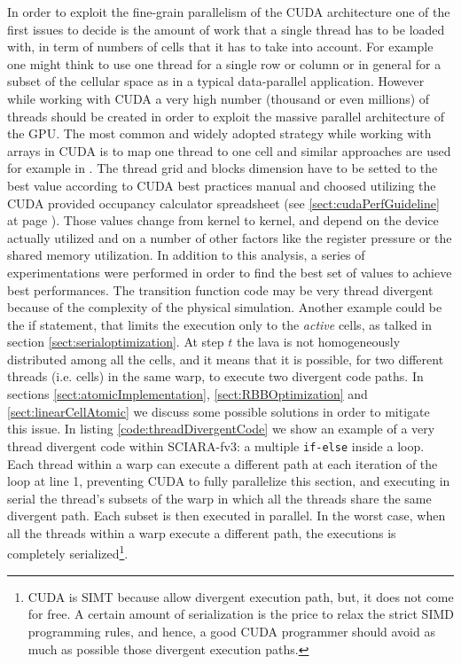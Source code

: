 In order to exploit the fine-grain parallelism of the CUDA architecture one of
the first issues to decide is the amount of work that a single thread has to be
loaded with, in term of numbers of cells that it has to take into account. For
example one might think to use one thread for a single row or column or in
general for a subset of the cellular space as in a typical data-parallel
application. However while working with CUDA a very high number (thousand or
even millions) of threads should be created in order to exploit the massive
parallel architecture of the GPU\cite{NvidiaprogGuide}. The most common and
widely adopted strategy while working with arrays in CUDA is to map one thread
to one cell and similar approaches are used for example in \cite{dambrosio2012}.
The thread grid and blocks dimension have to be setted to the best value
according to CUDA best practices\cite{CUDACBESTPRACTICE} manual and choosed
utilizing the CUDA provided occupancy calculator spreadsheet (see
\ref{sect:cudaPerfGuideline} at page \pageref{sect:cudaPerfGuideline}). Those
values change from kernel to kernel, and depend on the device actually utilized
and on a number of other factors like the register pressure or the shared memory
utilization. In addition to this analysis, a series of experimentations were
performed in order to find the best set of values to achieve best performances. 
The transition function code may be very thread divergent because of the
complexity of the physical simulation. Another example could be
the if statement, that limits the execution only to the \textit{active} cells,
as talked in section \ref{sect:serialoptimization}.
At step \(t\) the lava is not homogeneously distributed among all the cells, and
it means that it is possible, for two different threads (i.e. cells) in the same
warp, to execute two divergent code paths. In sections
\ref{sect:atomicImplementation}, \ref{sect:RBBOptimization} and
\ref{sect:linearCellAtomic} we discuss some possible solutions in order to
mitigate this issue.
In listing \ref{code:threadDivergentCode} we show an example of a very thread
divergent code within SCIARA-fv3: a multiple \texttt{if-else} inside a loop. Each
thread within a warp can execute a different path at each iteration of the loop at line 1, preventing CUDA to fully
parallelize this section, and executing in serial the thread's subsets of the
warp in which all the threads share the same divergent path. Each subset is then
executed in parallel. In the worst case, when all the threads within a warp
execute a different path, the executions is completely serialized\footnote{CUDA
is SIMT because allow divergent execution path, but, it does not come for free.
A certain amount of serialization is the price to relax the strict SIMD
programming rules, and hence, a good CUDA programmer should avoid as much as
possible those divergent execution paths.}\cite{NvidiaprogGuide}.





